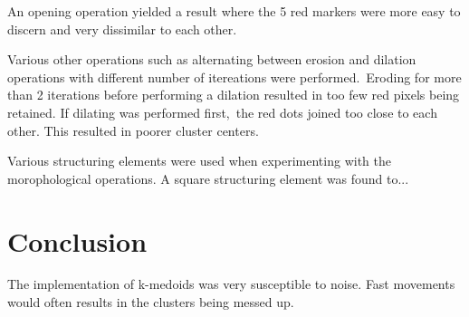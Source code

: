 \documentclass[12pt,a4paper]{article}
\begin{document}
      An opening operation yielded a result where the 5 red markers were more easy to discern and very dissimilar to each other.

      Various other operations such as alternating between erosion and dilation operations with different number of itereations were performed.\
      Eroding for more than 2 iterations before performing a dilation resulted in too few red pixels being retained. If dilating was performed first,\
      the red dots joined too close to each other. This resulted in poorer cluster centers.

      Various structuring elements were used when experimenting with the morophological operations. A square structuring element was found to...

    \section{Conclusion}
    The implementation of k-medoids was very susceptible to noise. Fast movements would often results in the clusters being messed up.
\end{document}
